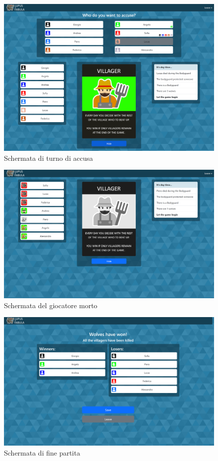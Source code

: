 \begin{figure}[H]
\centering
\includegraphics[width=\textwidth]{img/screen/desktop/accusation_desktop.png}
\caption{Schermata di turno di accusa}
\label{fig:accusation_desktop}
\end{figure}

\begin{figure}[H]
\centering
\includegraphics[width=\textwidth]{img/screen/desktop/dead_desktop.png}
\caption{Schermata del giocatore morto}
\label{fig:dead_desktop}
\end{figure}

\begin{figure}[H]
\centering
\includegraphics[width=\textwidth]{img/screen/desktop/won_desktop.png}
\caption{Schermata di fine partita}
\label{fig:won_desktop}
\end{figure}

